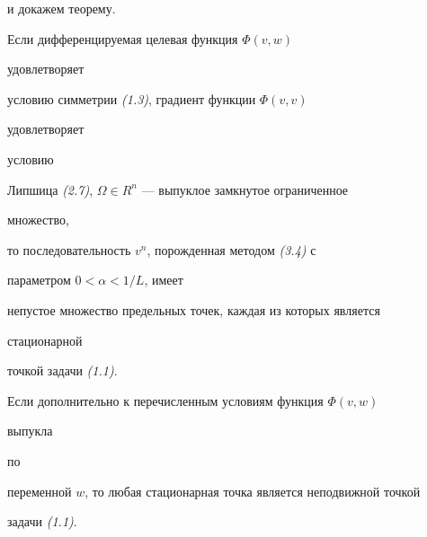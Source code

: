 и докажем теорему.





\begin{thm} Если дифференцируемая целевая функция $\Phi(v,w)$


удовлетворяет


условию симметрии {\em (1.3)}, градиент функции $\Phi(v,v)$


удовлетворяет


условию


Липшица {\em (2.7)}, $\Omega\in R^n$ --- выпуклое замкнутое ограниченное


множество,


то последовательность $v^n$, порожденная методом {\em (3.4)} с


параметром $0<\alpha<1/L$, имеет


непустое множество предельных точек, каждая из которых является


стационарной


точкой задачи {\em (1.1)}.





Если дополнительно к перечисленным условиям функция $\Phi(v,w)$


выпукла


по


переменной $w$, то любая стационарная точка является неподвижной точкой


задачи {\em (1.1)}.


\end{thm}





